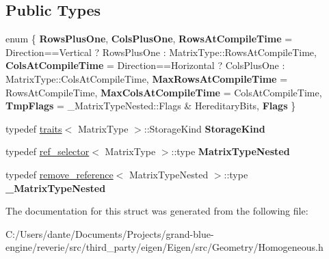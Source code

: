 \subsection*{Public Types}
\begin{DoxyCompactItemize}
\item 
\mbox{\label{struct_eigen_1_1internal_1_1traits_3_01_homogeneous_3_01_matrix_type_00_01_direction_01_4_01_4_ac6032ae10bef6eec23c4da06276708f0}} 
enum \{ \newline
{\bfseries Rows\+Plus\+One}, 
{\bfseries Cols\+Plus\+One}, 
{\bfseries Rows\+At\+Compile\+Time} = Direction==Vertical ? Rows\+Plus\+One \+: Matrix\+Type\+::Rows\+At\+Compile\+Time, 
{\bfseries Cols\+At\+Compile\+Time} = Direction==Horizontal ? Cols\+Plus\+One \+: Matrix\+Type\+::Cols\+At\+Compile\+Time, 
\newline
{\bfseries Max\+Rows\+At\+Compile\+Time} = Rows\+At\+Compile\+Time, 
{\bfseries Max\+Cols\+At\+Compile\+Time} = Cols\+At\+Compile\+Time, 
{\bfseries Tmp\+Flags} = \+\_\+\+Matrix\+Type\+Nested\+::Flags \& Hereditary\+Bits, 
{\bfseries Flags}
 \}
\item 
\mbox{\label{struct_eigen_1_1internal_1_1traits_3_01_homogeneous_3_01_matrix_type_00_01_direction_01_4_01_4_aed4bdbb49e3568372c304dceb4e71f20}} 
typedef \mbox{\hyperlink{struct_eigen_1_1internal_1_1traits}{traits}}$<$ Matrix\+Type $>$\+::Storage\+Kind {\bfseries Storage\+Kind}
\item 
\mbox{\label{struct_eigen_1_1internal_1_1traits_3_01_homogeneous_3_01_matrix_type_00_01_direction_01_4_01_4_ac910cb11e1c6d7e156b42207f2464c3c}} 
typedef \mbox{\hyperlink{struct_eigen_1_1internal_1_1ref__selector}{ref\+\_\+selector}}$<$ Matrix\+Type $>$\+::type {\bfseries Matrix\+Type\+Nested}
\item 
\mbox{\label{struct_eigen_1_1internal_1_1traits_3_01_homogeneous_3_01_matrix_type_00_01_direction_01_4_01_4_a9039583084765e94019831e2a903cad8}} 
typedef \mbox{\hyperlink{struct_eigen_1_1internal_1_1remove__reference}{remove\+\_\+reference}}$<$ Matrix\+Type\+Nested $>$\+::type {\bfseries \+\_\+\+Matrix\+Type\+Nested}
\end{DoxyCompactItemize}


The documentation for this struct was generated from the following file\+:\begin{DoxyCompactItemize}
\item 
C\+:/\+Users/dante/\+Documents/\+Projects/grand-\/blue-\/engine/reverie/src/third\+\_\+party/eigen/\+Eigen/src/\+Geometry/Homogeneous.\+h\end{DoxyCompactItemize}
